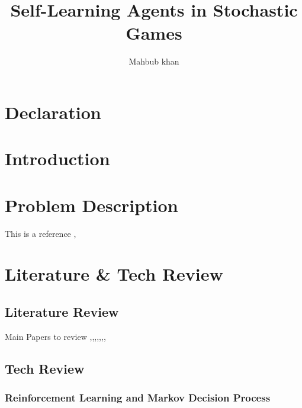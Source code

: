 \documentclass[a4paper]{report}
\begin{document}
\title{Self-Learning Agents in Stochastic Games}
\author{Mahbub khan}
\date{}
\maketitle
{}
\chapter*{Declaration}
\tableofcontents
\listoffigures
\listoftables

\begin{abstract}
\end{abstract}

\chapter{Introduction}
\label{ch:intro}





\chapter{Problem Description}
\label{ch:description}
This is a reference \cite{Mnih2015},





\chapter{Literature \& Tech Review}
\label{ch:review}

\section{Literature Review}

Main Papers to review \cite{Mnih2015},\cite{Mnih13},\cite{ODonoghueMKM16},\cite{LevineS18:journals/corr/abs-1805-00909},\cite{Silver14},\cite{Haaronja17},\cite{Haaronja18},\cite{Junhyuk2018}

\section{Tech Review}

\subsection{Reinforcement Learning and Markov Decision Process}
\end{document}
